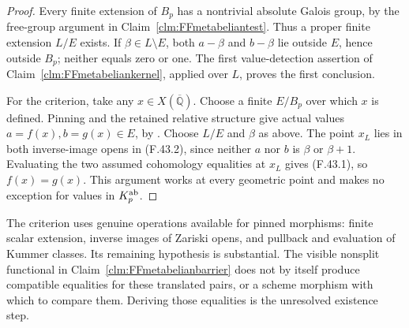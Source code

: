 \documentclass[11pt]{article}
\begin{document}
\begin{proof}
Every finite extension of \(B_p\)
has a nontrivial absolute Galois
group, by the free-group argument
in Claim~\ref{clm:FFmetabeliantest}.
Thus a proper finite extension
\(L/E\) exists. If
\(\beta\in L\setminus E\), both
\(a-\beta\) and \(b-\beta\)
lie outside \(E\), hence outside
\(B_p\); neither equals zero or
one. The first value-detection
assertion of
Claim~\ref{clm:FFmetabeliankernel},
applied over \(L\), proves the
first conclusion.

For the criterion, take any
\(x\in X(\overline{\mathbb Q})\).
Choose a finite \(E/B_p\) over
which \(x\) is defined. Pinning
and the retained relative structure
give actual values
\(a=f(x),b=g(x)\in E\), by
\citep[Proposition~3.6]{FF_CHW2024}.
Choose \(L/E\) and \(\beta\)
as above. The point \(x_L\)
lies in both inverse-image opens
in (F.43.2), since neither \(a\)
nor \(b\) is \(\beta\) or
\(\beta+1\). Evaluating the two
assumed cohomology equalities at
\(x_L\) gives (F.43.1), so
\(f(x)=g(x)\). This argument
works at every geometric point
and makes no exception for values
in \(K_p^{\rm ab}\).
\end{proof}

The criterion uses genuine operations
available for pinned morphisms:
finite scalar extension, inverse images
of Zariski opens, and pullback and
evaluation of Kummer classes. Its
remaining hypothesis is substantial.
The visible nonsplit functional in
Claim~\ref{clm:FFmetabelianbarrier}
does not by itself produce compatible
equalities for these translated pairs,
or a scheme morphism with which to
compare them. Deriving those equalities
is the unresolved existence step.
\end{document}
